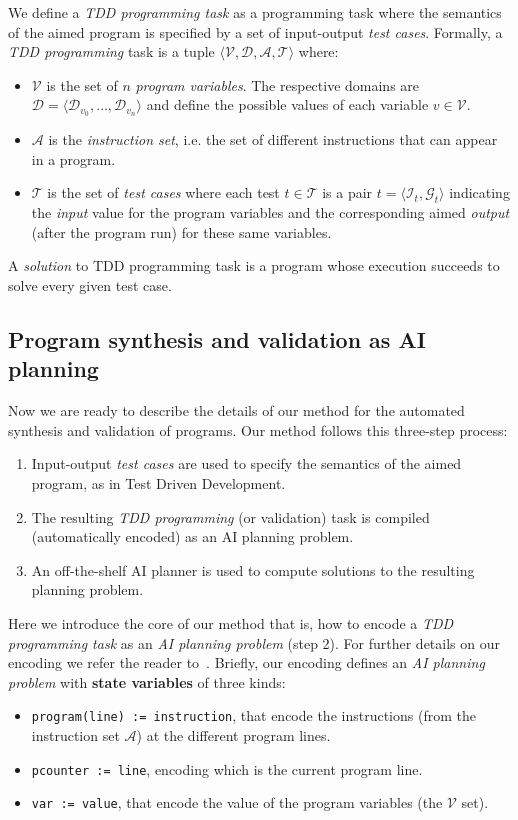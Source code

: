 \documentclass[10pt,a4paper]{paper}
\newcommand{\tup}[1]{{\langle #1 \rangle}}
\begin{document}
We define a {\em TDD programming task} as a programming task where the semantics of the aimed program is specified by a set of input-output {\em test cases}. Formally, a {\em TDD programming} task is a tuple $\tup{{\mathcal V},{\mathcal D},{\mathcal A}, {\mathcal T}}$ where:
\begin{itemize}
\item ${\mathcal V}$ is the set of $n$ {\em program variables}. The respective domains are ${\mathcal D}=\tup{{\mathcal D}_{v_0}, \ldots, {\mathcal D}_{v_n}}$ and define the possible values of each variable $v\in {\mathcal V}$.
\item ${\mathcal A}$ is the {\em instruction set}, i.e. the set of different instructions that can appear in a program.
\item ${\mathcal T}$ is the set of {\em test cases} where each test $t\in {\mathcal T}$ is a pair $t=\tup{{\mathcal I}_t,{\mathcal G}_t}$ indicating the {\em input} value for the program variables and the corresponding aimed {\em output} (after the program run) for these same variables.
\end{itemize}
A {\em solution} to TDD programming task is a program whose execution succeeds to solve every given test case.


\subsection{Program synthesis and validation as AI planning}
Now we are ready to describe the details of our method for the automated synthesis and validation of programs. Our method follows this three-step process:
\begin{enumerate}
\item Input-output {\em test cases} are used to specify the semantics of the aimed program, as in Test Driven Development.
\item The resulting {\em TDD programming} (or validation) task is compiled (automatically encoded) as an AI planning problem.
\item An off-the-shelf AI planner is used to compute solutions to the resulting planning problem.
\end{enumerate}  

Here we introduce the core of our method that is, how to encode a {\em TDD programming task} as an {\em AI planning problem} (step 2). For further details on our encoding we refer the reader to~\cite{jimenez2015computing,sergio:aprograming:icaps16,sergio:aprogramingb:ijcai16,sergio:aprograming:ijcai16,segovia2017generating,segovia:FSC:JAIR2018,segovia:programs:AIJ19}. Briefly, our encoding defines an {\em AI planning problem} with {\bf state variables} of three kinds:
\begin{itemize}
\item {\tt program(line) := instruction}, that encode the instructions (from the instruction set ${\mathcal A}$) at the different program lines. 
\item {\tt pcounter := line}, encoding which is the current program line. 
\item {\tt var := value}, that encode the value of the program variables (the ${\mathcal V}$ set). 
\end {itemize}
\end{document}
